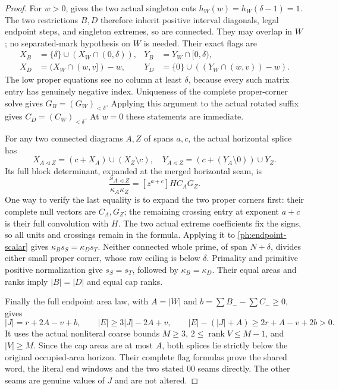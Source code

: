 \documentclass[11pt,a4paper]{amsart}
\numberwithin{equation}{section}
\theoremstyle{plain}
\theoremstyle{definition}
\begin{document}
\begin{proof}
For \(w>0\),  gives the two actual singleton cuts
\(h_W(w)=h_W(\delta-1)=1\).
The two restrictions \(B,D\) therefore inherit positive interval
diagonals, legal endpoint steps, and singleton extremes, so are
connected.  They may overlap in \(W\); no separated-mark hypothesis
on \(W\) is needed.
Their exact flags are
\[
 \begin{aligned}
 X_B&=\{\delta\}\cup(X_W\cap(0,\delta)),&
 Y_B&=Y_W\cap[0,\delta),\\
 X_D&=(X_W\cap(w,v])-w,&
 Y_D&=\{0\}\cup((Y_W\cap(w,v))-w).
 \end{aligned}
\]
The low proper equations see no column at least \(\delta\), because
every such matrix entry has genuinely negative index.
Uniqueness of the complete proper-corner solve gives
\(G_B=(G_W)_{<\delta}\).
Applying this argument to the actual rotated suffix gives
\(C_D=(C_W)_{<\delta}\).
At \(w=0\) these statements are immediate.

For any two connected diagrams \(A,Z\) of spans \(a,c\), the actual
horizontal splice has
\[
 X_{A\triangleleft Z}=(c+X_A)\cup(X_Z\setminus c),\quad
 Y_{A\triangleleft Z}=(c+(Y_A\setminus0))\cup Y_Z.
\]
Its full block determinant, expanded at the merged horizontal seam,
is
\[
 \frac{s_{A\triangleleft Z}}{\kappa_A\kappa_Z}
              =[z^{a+c}]H C_A G_Z.
\]
One way to verify the last equality is to expand the two proper
corners first: their complete null vectors are \(C_A,G_Z\);
the remaining crossing entry at exponent \(a+c\) is their full
convolution with \(H\).  The two actual extreme coefficients fix
the signs, so all units and crossings remain in the formula.
Applying it to \eqref{ph:endpoint-scalar} gives
\(\kappa_Bs_S=\kappa_Ds_T\).
Neither connected whole prime, of span \(N+\delta\), divides either
small proper corner, whose raw ceiling is below \(\delta\).
Primality and primitive positive normalization give
\(s_S=s_T\), followed by \(\kappa_B=\kappa_D\).
Their equal areas and ranks imply \(|B|=|D|\) and equal cap ranks.

Finally the full endpoint area law, with
\(A=|W|\) and \(b=\sum B_--\sum C_-\ge0\), gives
\[
 |J|=r+2A-v+b,\qquad
 |E|\ge3|J|-2A+v,\qquad
 |E|-(|J|+A)\ge2r+A-v+2b>0.
\]
It uses the actual nonliteral coarse bounds \(M\ge3\),
\(2\le\operatorname{rank}V\le M-1\), and \(|V|\ge M\).
Since the cap areas are at most \(A\), both splices lie strictly
below the original occupied-area horizon.
Their complete flag formulas prove the shared word, the literal end
windows and the two stated \(00\) seams directly.
The other seams are genuine values of \(J\) and are not altered.
\end{proof}
\end{document}
